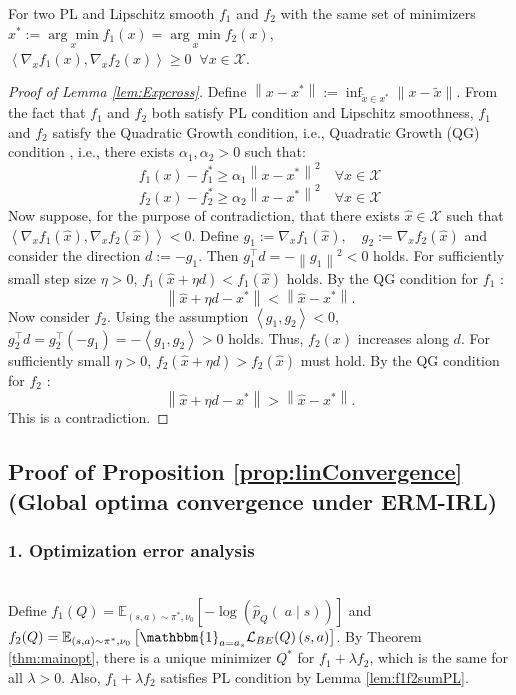 \begin{lem}\label{lem:Expcross}
    For two PL and Lipschitz smooth $f_1$ and $f_2$ with the same set of minimizers $x^\ast:=\underset{x}{\arg \min } f_1(x)=\underset{x}{\arg \min } f_2(x)$, $\left\langle\nabla_x f_1(x), \nabla_x f_2(x)\right\rangle \ge 0\;\;\forall x \in \mathcal{X}$.
\end{lem}
\begin{proof}[Proof of Lemma \ref{lem:Expcross}]
    Define $\left\|x-x^\ast\right\|:=\inf _{\tilde{x} \in x^\ast}\|x-\tilde{x}\|$. From the fact that $f_1$ and $f_2$ both satisfy PL condition and Lipschitz smoothness, $f_1$ and $f_2$ satisfy the Quadratic Growth condition, i.e., Quadratic Growth (QG) condition \cite{liao2024error}, i.e., 
    there exists $\alpha_1, \alpha_2>0$ such that:
$$
f_1(x)-f_1^\ast \geq \alpha_1\left\|x-x^\ast\right\|^2 \quad \forall x\in\mathcal{X}
$$
$$
f_2(x)-f_2^\ast \geq \alpha_2\left\|x-x^\ast\right\|^2 \quad \forall x\in\mathcal{X}
$$
Now suppose, for the purpose of contradiction, that there exists $\hat{x} \in \mathcal{X}$ such that $
\left\langle\nabla_x f_1(\hat{x}), \nabla_x f_2(\hat{x})\right\rangle<0
$. Define 
$g_1:=\nabla_x f_1(\hat{x}), \quad g_2:=\nabla_x f_2(\hat{x})$ and consider the direction $d:=-g_1$. Then $g_1^{\top} d=-\left\|g_1\right\|^2<0$ holds. For sufficiently small step size $\eta>0$, $
f_1(\hat{x}+\eta d)<f_1(\hat{x})
$ holds.
By the QG condition for $f_1$ :
$$
\left\|\hat{x}+\eta d-x^\ast\right\|<\left\|\hat{x}-x^\ast\right\| .
$$
Now consider $f_2$. Using the assumption $\left\langle g_1, g_2\right\rangle<0$, $
g_2^{\top} d=g_2^{\top}\left(-g_1\right)=-\left\langle g_1, g_2\right\rangle>0
$ holds.
Thus, $f_2(x)$ increases along $d$. For sufficiently small $\eta>0$, 
$
f_2(\hat{x}+\eta d)>f_2(\hat{x})
$ must hold. 
By the QG condition for $f_2$ :
$$\left\|\hat{x}+\eta d-x^\ast\right\|>\left\|\hat{x}-x^\ast\right\| .
$$
This is a contradiction.
\end{proof}
\fi



\subsection{Proof of Proposition \ref{prop:linConvergence} (Global optima convergence under ERM-IRL)}\label{sec:ProofLinConv}


\subsubsection*{1. Optimization error analysis}\;
\\
Define 
$f_1(Q)=\mathbb{E}_{(s, a)\sim \pi^*, \nu_0}  \left[-\log\left(\hat{p}_{Q}(\;a
    \mid s)\right)\right]$ and $f_2(Q)=\mathbb{E}_{(s, a)\sim \pi^*, \nu_0}  \left[ \mathbbm{1}_{a = a_s} \mathcal{L}_{BE}(Q)\left(s,a\right)\right]$.
    By Theorem \ref{thm:mainopt}, there is a unique minimizer $Q^*$ for $f_1+\lambda f_2$, which is the same for all $\lambda>0$. Also, $ f_1+\lambda f_2$ satisfies PL condition by Lemma \ref{lem:f1f2sumPL}.

